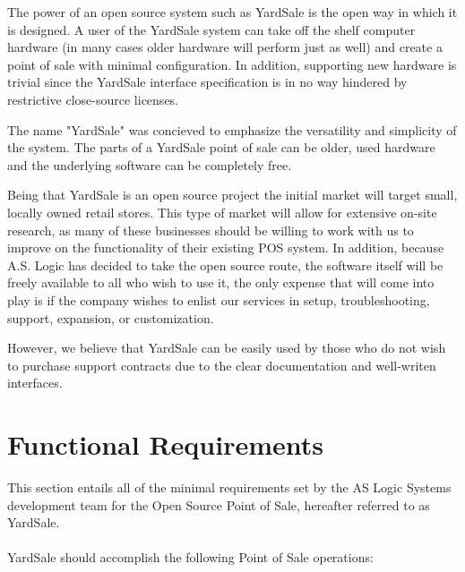 \documentclass{report}
\begin{document}
        The power of an open source system such as YardSale is the
        open way in which it is designed.  A user of the YardSale system
        can take off the shelf computer hardware (in many cases older hardware
        will perform just as well) and create a point of sale with minimal
        configuration.  In addition, supporting new hardware is trivial since
        the YardSale interface specification is in no way hindered by
        restrictive close-source licenses.

        The name "YardSale" was concieved to emphasize the
        versatility and simplicity of the system.  The parts of a
        YardSale point of sale can be older, used hardware and
        the underlying software can be completely free.

        Being that YardSale is an open source project the initial
        market will target small, locally owned retail
        stores.  This type of market will allow for extensive on-site
        research, as many of these businesses should be willing to work
        with us to improve on the functionality of their existing POS
        system.  In addition, because A.S. Logic has decided to take the
        open source route, the software itself will be freely available to
        all who wish to use it, the only expense that will come into play
        is if the company wishes to enlist our services in setup,
        troubleshooting, support, expansion, or customization.

        However, we believe that YardSale can be easily used by
        those who do not wish to purchase support contracts due to
        the clear documentation and well-writen interfaces.

    \section{Functional Requirements}

        This section entails all of the minimal requirements set by the AS
        Logic Systems development team for the Open Source Point of Sale, hereafter referred
        to as YardSale.\\
        \\YardSale should accomplish the following Point of Sale operations:
\end{document}
